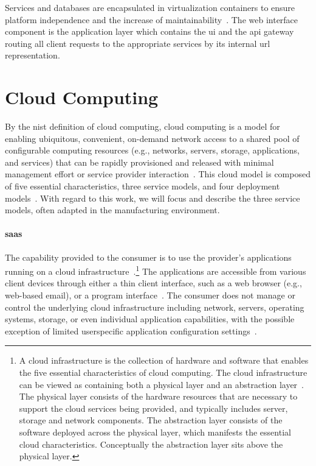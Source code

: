 \documentclass[
a4paper,
twoside,
headsepline,
cleardoublepage=empty,
parskip=half,
draft=false
]{scrbook}
\begin{document}
			Services and databases are encapsulated in virtualization containers to ensure platform independence and the increase of maintainability~\cite{xen.17b}.
			The web interface component is the application layer which contains the \gls{ui} and the \gls{api} gateway routing all client requests to the appropriate services by its internal \gls{url} representation.

		\section{Cloud Computing}\label{sec:cloud_computing}

			By the \gls{nist} definition of cloud computing, cloud computing is a model for enabling ubiquitous, convenient, on-demand network access to a shared pool of configurable computing resources (e.g., networks, servers, storage, applications, and services) that can be rapidly provisioned and released with minimal management effort or service provider interaction~\cite{mell2011nist}.
			This cloud model is composed of five essential characteristics, three service models, and four deployment
			models~\cite{fehling2014cloud}. With regard to this work, we will focus and describe the three service models, often adapted in the manufacturing environment.

			\paragraph{\gls{saas}} The capability provided to the consumer is to use the provider's applications running on a cloud infrastructure~\cite{mell2011nist}.\footnote{A cloud infrastructure is the collection of hardware and software that enables the five essential characteristics of cloud computing. The cloud infrastructure can be viewed as containing both a physical layer and an abstraction layer~\cite{fehling2014cloud}. The physical layer consists of the hardware resources that are necessary to support the cloud services being provided, and typically includes server, storage and network components. The abstraction layer consists of the software deployed across the physical layer, which manifests the essential cloud characteristics. Conceptually the abstraction layer sits above the physical layer.}
			The applications are accessible from various client devices through either a thin client interface, such as a web browser (e.g., web-based email), or a program interface~\cite{mell2011nist}.
			The consumer does not manage or control the underlying cloud infrastructure including network, servers, operating systems, storage, or even individual application capabilities, with the possible exception of limited userspecific application configuration settings~\cite{mell2011nist}.
\end{document}
